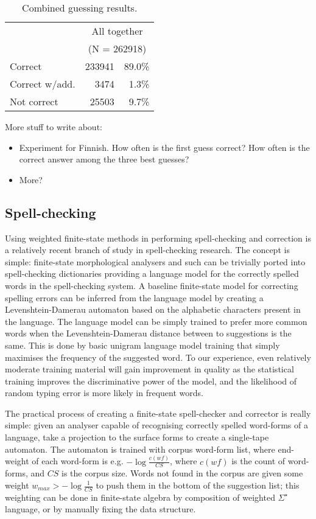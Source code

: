 \documentclass{llncs}
\begin{document}
\begin{table}
\begin{center}
\begin{tabular}{l|rr}
        & \multicolumn{2}{c}{All together}\\
        & \multicolumn{2}{c}{(N = 262918)}\\
\hline
Correct        & 233941 & 89.0\%\\
Correct w/add. &   3474 &  1.3\%\\
Not correct    &  25503 &  9.7\%\\
\end{tabular}
\caption{Combined guessing results.}\label{tab:lang-id-acc}
\end{center}
\end{table}

More stuff to write about:
\begin{itemize}
\item Experiment for Finnish. How often is the first guess correct?
  How often is the correct answer among the three best guesses?
\item More?
\end{itemize}


\subsection{Spell-checking}

Using weighted finite-state methods in performing spell-checking and correction 
is a relatively recent branch of study in spell-checking research. The concept
is simple: finite-state morphological analysers and such can be trivially ported
into spell-checking dictionaries providing a language model for the correctly
spelled words in the spell-checking system. A baseline finite-state model for
correcting spelling errors can be inferred from the language model by creating
a Levenshtein-Damerau automaton based on the alphabetic characters present in
the language. The language model can be simply trained to prefer more common
words when the Levenshtein-Damerau distance between to suggestions is the same.
This is done by basic unigram language model training that simply maximises
the frequency of the suggested word. To our experience, even relatively moderate
training material will gain improvement in quality as the statistical training
improves the discriminative power of the model, and the likelihood of random
typing error is more likely in frequent words.

The practical process of creating a finite-state spell-checker and corrector
is really simple: given an analyser capable of recognising correctly spelled
word-forms of a language, take a projection to the surface forms to create a
single-tape automaton. The automaton is trained with corpus word-form list, 
where end-weight of each word-form is e.g. $-\log\frac{c(wf)}{CS}$, where 
$c(wf)$ is the count of word-forms, and $CS$ is the corpus size. Words not
found in the corpus are given some weight $w_{max} > -\log\frac{1}{CS}$ to
push them in the bottom of the suggestion list; this weighting can be done
in finite-state algebra by composition of weighted $\Sigma^{\star}$ language,
or by manually fixing the data structure.
\end{document}
